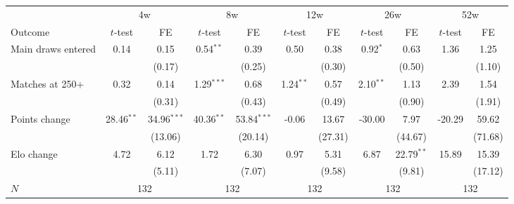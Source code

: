 \begin{tabular}{l cc cc cc cc cc}
\toprule
 & \multicolumn{2}{c}{4w} & \multicolumn{2}{c}{8w} & \multicolumn{2}{c}{12w} & \multicolumn{2}{c}{26w} & \multicolumn{2}{c}{52w} \\
\cmidrule(lr){2-3} \cmidrule(lr){4-5} \cmidrule(lr){6-7} \cmidrule(lr){8-9} \cmidrule(lr){10-11}
Outcome & $t$-test & FE & $t$-test & FE & $t$-test & FE & $t$-test & FE & $t$-test & FE \\
\midrule
Main draws entered & 0.14 & 0.15 & 0.54$^{**}$ & 0.39 & 0.50 & 0.38 & 0.92$^{*}$ & 0.63 & 1.36 & 1.25 \\
 & & (0.17) & & (0.25) & & (0.30) & & (0.50) & & (1.10) \\
\addlinespace
Matches at 250+ & 0.32 & 0.14 & 1.29$^{***}$ & 0.68 & 1.24$^{**}$ & 0.57 & 2.10$^{**}$ & 1.13 & 2.39 & 1.54 \\
 & & (0.31) & & (0.43) & & (0.49) & & (0.90) & & (1.91) \\
\addlinespace
Points change & 28.46$^{**}$ & 34.96$^{***}$ & 40.36$^{**}$ & 53.84$^{***}$ & -0.06 & 13.67 & -30.00 & 7.97 & -20.29 & 59.62 \\
 & & (13.06) & & (20.14) & & (27.31) & & (44.67) & & (71.68) \\
\addlinespace
Elo change & 4.72 & 6.12 & 1.72 & 6.30 & 0.97 & 5.31 & 6.87 & 22.79$^{**}$ & 15.89 & 15.39 \\
 & & (5.11) & & (7.07) & & (9.58) & & (9.81) & & (17.12) \\
\addlinespace
$N$ & \multicolumn{2}{c}{132} & \multicolumn{2}{c}{132} & \multicolumn{2}{c}{132} & \multicolumn{2}{c}{132} & \multicolumn{2}{c}{132} \\
\bottomrule
\end{tabular}
